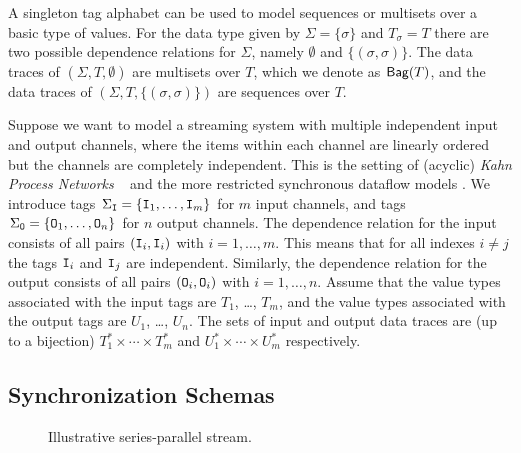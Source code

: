 A singleton tag alphabet can be used to model sequences or multisets over a basic type of values. For the data type given by $\Sigma = \{\sigma\}$ and $T_\sigma = T$ there are two possible dependence relations for $\Sigma$, namely $\emptyset$ and $\{(\sigma,\sigma)\}$. The data traces of $(\Sigma,T,\emptyset)$ are multisets over $T$, which we denote as ${\textstyle\mathop{\mathsf{Bag}}}(T)$, and the data traces of $(\Sigma,T,\{(\sigma,\sigma)\})$ are sequences over $T$.

\begin{example}
\label{ex:channels}
Suppose we want to model a streaming system with multiple independent input and output channels, where the items within each channel are linearly ordered but the channels are completely independent. This is the setting of (acyclic) \emph{Kahn Process Networks} ~\cite{gilles1974semantics} and the more restricted synchronous dataflow models \cite{lee1987synchronous, benveniste2003synchronous}. We introduce tags $\Sigma_{\texttt{I}} = \{ \texttt{I}_1, \ldots, \texttt{I}_m \}$ for $m$ input channels, and tags $\Sigma_{\texttt{O}} = \{ \texttt{O}_1, \ldots, \texttt{O}_n \}$ for $n$ output channels.
The dependence relation for the input consists of all pairs $(\texttt{I}_i,\texttt{I}_i)$ with $i = 1, \ldots, m$. This means that for all indexes $i \neq j$ the tags $\texttt{I}_i$ and $\texttt{I}_j$ are independent. Similarly, the dependence relation for the output consists of all pairs $(\texttt{O}_i,\texttt{O}_i)$ with $i = 1, \ldots, n$. Assume that the value types associated with the input tags are $T_1$, \ldots, $T_m$, and the value types associated with the output tags are $U_1$, \ldots, $U_n$. The sets of input and output data traces are (up to a bijection) $T^*_1 \times \cdots \times T^*_m$ and $U^*_1 \times \cdots \times U^*_m$ respectively.
\end{example}

\subsection{Synchronization Schemas}

\begin{figure}
    \centering
    \caption{Illustrative series-parallel stream.}
    \label{fig:gps-sps}
\end{figure}


